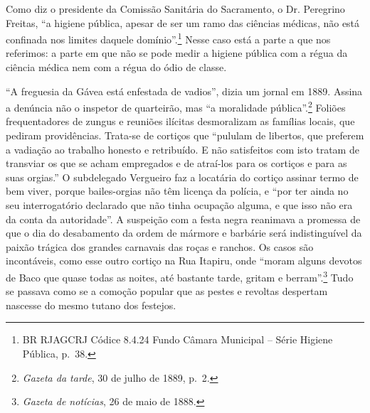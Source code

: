 Como diz o presidente da Comissão Sanitária do Sacramento, o Dr.
Peregrino Freitas, ``a higiene pública, apesar de ser um ramo das
ciências médicas, não está confinada nos limites daquele
domínio''.\footnote{BR RJAGCRJ Códice 8.4.24 Fundo Câmara Municipal --
  Série Higiene Pública, p.~38.} Nesse caso está a parte a que nos
referimos: a parte em que não se pode medir a higiene pública com a
régua da ciência médica nem com a régua do ódio de classe.

``A freguesia da Gávea está enfestada de vadios'', dizia um jornal em
1889. Assina a denúncia não o inspetor de quarteirão, mas ``a moralidade
pública''.\footnote{\emph{Gazeta da tarde}, 30 de julho de 1889, p.~2.}
Foliões frequentadores de zungus e reuniões ilícitas desmoralizam as
famílias locais, que pediram providências. Trata-se de cortiços que
``pululam de libertos, que preferem a vadiação ao trabalho honesto e
retribuído. E não satisfeitos com isto tratam de transviar os que se
acham empregados e de atraí-los para os cortiços e para as suas
orgias.'' O subdelegado Vergueiro faz a locatária do cortiço assinar
termo de bem viver, porque bailes-orgias não têm licença da polícia, e
``por ter ainda no seu interrogatório declarado que não tinha ocupação
alguma, e que isso não era da conta da autoridade''. A suspeição com a
festa negra reanimava a promessa de que o dia do desabamento da ordem de
mármore e barbárie será indistinguível da paixão trágica dos grandes
carnavais das roças e ranchos. Os casos são incontáveis, como esse outro
cortiço na Rua Itapiru, onde ``moram alguns devotos de Baco que quase
todas as noites, até bastante tarde, gritam e berram''.\footnote{\emph{Gazeta
  de notícias}, 26 de maio de 1888.} Tudo se passava como se a comoção
popular que as pestes e revoltas despertam nascesse do mesmo tutano dos
festejos.


